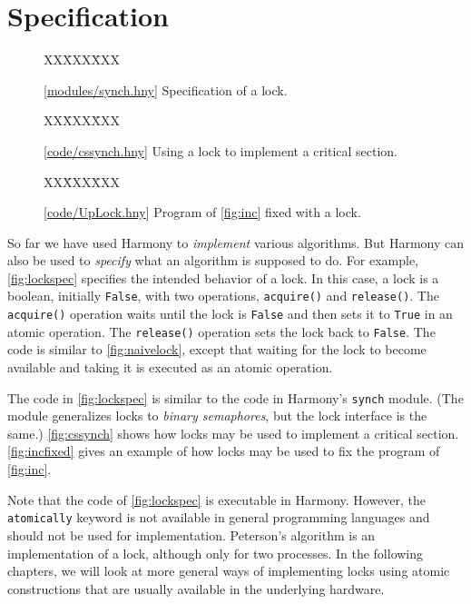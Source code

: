 \documentclass{report}
\newcommand{\harmonysource}[1]{
\begin{tabbing}
XX\=XXX\=XXX\kill
    
\end{tabbing}
}
\newcommand{\harmonylink}[1]{%
[\href{https://harmony.cs.cornell.edu/#1}{\underline{#1}}]%
}
\newenvironment{code}{
\tcolorbox
}{
\endtcolorbox
}
\begin{document}
\chapter{Specification}
\label{ch:specification}

\begin{figure}
\begin{code}
\harmonysource{lockspec}
\end{code}
\caption{\harmonylink{modules/synch.hny} Specification of a lock.}
\label{fig:lockspec}
\end{figure}

\begin{figure}
\begin{code}
\harmonysource{cssynch}
\end{code}
\caption{\harmonylink{code/cssynch.hny} Using a lock to implement a
critical section.}
\label{fig:cssynch}
\end{figure}

\begin{figure}
\begin{code}
\harmonysource{UpLock}
\end{code}
\caption{\harmonylink{code/UpLock.hny} Program of \autoref{fig:inc} fixed with a lock.}
\label{fig:incfixed}
\end{figure}

So far we have used Harmony to \emph{implement} various algorithms.
But Harmony can also be used to \emph{specify} what an algorithm is
supposed to do.
For example, \autoref{fig:lockspec} specifies the intended behavior
of a lock.
In this case, a lock is a boolean, initially \texttt{False},
with two operations, \texttt{acquire()} and \texttt{release()}.
The \texttt{acquire()} operation waits until the lock is \texttt{False}
and then sets it to \texttt{True} in an atomic operation.
The \texttt{release()} operation sets the lock back to \texttt{False}.
The code is similar to \autoref{fig:naivelock}, except that waiting
for the lock to become available and taking it is executed as an
atomic operation.

The code in \autoref{fig:lockspec} is similar to the code in
Harmony's \texttt{synch} module.
(The module generalizes locks to \emph{binary semaphores}, but the
lock interface is the same.)
\autoref{fig:cssynch} shows how locks may be used to implement
a critical section.
\autoref{fig:incfixed} gives an example of how locks may be used
to fix the program of \autoref{fig:inc}.

Note that the code of \autoref{fig:lockspec} is executable in Harmony.
However, the \texttt{atomically} keyword is not available in general
programming languages and should not be used for implementation.
Peterson's algorithm is an implementation of a lock, although only for
two processes.  In the following chapters, we will look at more general
ways of implementing locks using atomic constructions that are usually
available in the underlying hardware.
\end{document}
